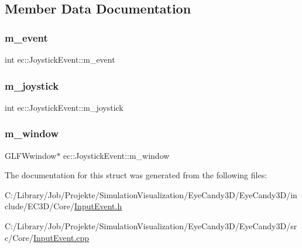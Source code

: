 \subsection{Member Data Documentation}
\mbox{\label{structec_1_1_joystick_event_acf4361edcb473cbf0567137224c86f2a}} 
\subsubsection{\texorpdfstring{m\+\_\+event}{m\_event}}
{\footnotesize\ttfamily int ec\+::\+Joystick\+Event\+::m\+\_\+event}

\mbox{\label{structec_1_1_joystick_event_a415b6d2d801b41db8f3dee6b2be35448}} 
\subsubsection{\texorpdfstring{m\+\_\+joystick}{m\_joystick}}
{\footnotesize\ttfamily int ec\+::\+Joystick\+Event\+::m\+\_\+joystick}

\mbox{\label{structec_1_1_joystick_event_a9b108de0a7db9268dd11642a203ef816}} 
\subsubsection{\texorpdfstring{m\+\_\+window}{m\_window}}
{\footnotesize\ttfamily G\+L\+F\+Wwindow$\ast$ ec\+::\+Joystick\+Event\+::m\+\_\+window}



The documentation for this struct was generated from the following files\+:\begin{DoxyCompactItemize}
\item 
C\+:/\+Library/\+Job/\+Projekte/\+Simulation\+Visualization/\+Eye\+Candy3\+D/\+Eye\+Candy3\+D/include/\+E\+C3\+D/\+Core/\mbox{\hyperlink{_input_event_8h}{Input\+Event.\+h}}\item 
C\+:/\+Library/\+Job/\+Projekte/\+Simulation\+Visualization/\+Eye\+Candy3\+D/\+Eye\+Candy3\+D/src/\+Core/\mbox{\hyperlink{_input_event_8cpp}{Input\+Event.\+cpp}}\end{DoxyCompactItemize}
